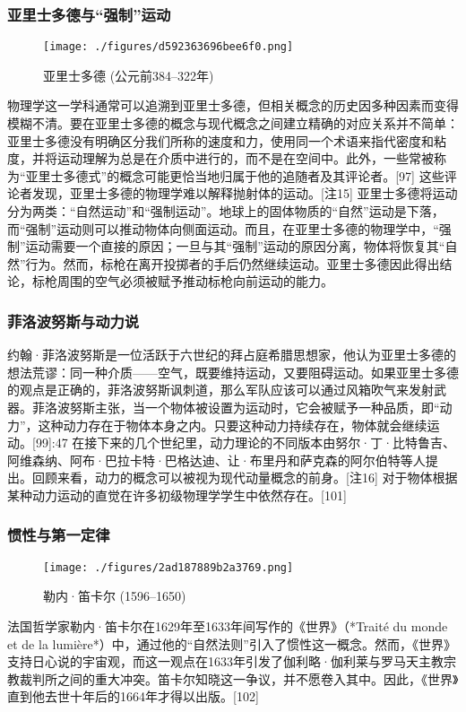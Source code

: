 \subsubsection{亚里士多德与“强制”运动}  
\begin{figure}[ht]
\centering
\texttt{[image: ./figures/d592363696bee6f0.png]}
\caption{亚里士多德 (公元前384–322年)} \label{fig_NEW01_17}
\end{figure}
物理学这一学科通常可以追溯到亚里士多德，但相关概念的历史因多种因素而变得模糊不清。要在亚里士多德的概念与现代概念之间建立精确的对应关系并不简单：亚里士多德没有明确区分我们所称的速度和力，使用同一个术语来指代密度和粘度，并将运动理解为总是在介质中进行的，而不是在空间中。此外，一些常被称为“亚里士多德式”的概念可能更恰当地归属于他的追随者及其评论者。[97] 这些评论者发现，亚里士多德的物理学难以解释抛射体的运动。[注15] 亚里士多德将运动分为两类：“自然运动”和“强制运动”。地球上的固体物质的“自然”运动是下落，而“强制”运动则可以推动物体向侧面运动。而且，在亚里士多德的物理学中，“强制”运动需要一个直接的原因；一旦与其“强制”运动的原因分离，物体将恢复其“自然”行为。然而，标枪在离开投掷者的手后仍然继续运动。亚里士多德因此得出结论，标枪周围的空气必须被赋予推动标枪向前运动的能力。
\subsubsection{菲洛波努斯与动力说}
约翰·菲洛波努斯是一位活跃于六世纪的拜占庭希腊思想家，他认为亚里士多德的想法荒谬：同一种介质——空气，既要维持运动，又要阻碍运动。如果亚里士多德的观点是正确的，菲洛波努斯讽刺道，那么军队应该可以通过风箱吹气来发射武器。菲洛波努斯主张，当一个物体被设置为运动时，它会被赋予一种品质，即“动力”，这种动力存在于物体本身之内。只要这种动力持续存在，物体就会继续运动。[99]:47 在接下来的几个世纪里，动力理论的不同版本由努尔·丁·比特鲁吉、阿维森纳、阿布·巴拉卡特·巴格达迪、让·布里丹和萨克森的阿尔伯特等人提出。回顾来看，动力的概念可以被视为现代动量概念的前身。[注16] 对于物体根据某种动力运动的直觉在许多初级物理学学生中依然存在。[101]
\subsubsection{惯性与第一定律} 
\begin{figure}[ht]
\centering
\texttt{[image: ./figures/2ad187889b2a3769.png]}
\caption{勒内·笛卡尔   (1596–1650)} \label{fig_NEW01_19}
\end{figure}
法国哲学家勒内·笛卡尔在1629年至1633年间写作的《世界》（*Traité du monde et de la lumière*）中，通过他的“自然法则”引入了惯性这一概念。然而，《世界》支持日心说的宇宙观，而这一观点在1633年引发了伽利略·伽利莱与罗马天主教宗教裁判所之间的重大冲突。笛卡尔知晓这一争议，并不愿卷入其中。因此，《世界》直到他去世十年后的1664年才得以出版。[102]

